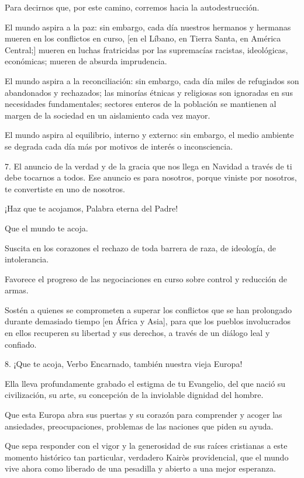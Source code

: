 \begin{body}
	Para decirnos que, por este camino, corremos hacia la autodestrucción.
	
	El mundo aspira a la paz: sin embargo, cada día nuestros hermanos y hermanas mueren en los conflictos en curso, {[}en el Líbano, en Tierra Santa, en América Central;{]} mueren en luchas fratricidas por las supremacías racistas, ideológicas, económicas; mueren de absurda imprudencia.
	
	El mundo aspira a la reconciliación: sin embargo, cada día miles de refugiados son abandonados y rechazados; las minorías étnicas y religiosas son ignoradas en sus necesidades fundamentales; sectores enteros de la población se mantienen al margen de la sociedad en un aislamiento cada vez mayor.
	
	El mundo aspira al equilibrio, interno y externo: sin embargo, el medio ambiente se degrada cada día más por motivos de interés o inconsciencia.
	
	7. El anuncio de la verdad y de la gracia que nos llega en Navidad a través de ti debe tocarnos a todos. Ese anuncio es para nosotros, porque viniste por nosotros, te convertiste en uno de nosotros.
	
	¡Haz que te acojamos, Palabra eterna del Padre!
	
	Que el mundo te acoja.
	
	Suscita en los corazones el rechazo de toda barrera de raza, de ideología, de intolerancia.
	
	Favorece el progreso de las negociaciones en curso sobre control y reducción de armas.
	
	Sostén a quienes se comprometen a superar los conflictos que se han prolongado durante demasiado tiempo {[}en África y Asia{]}, para que los pueblos involucrados en ellos recuperen su libertad y sus derechos, a través de un diálogo leal y confiado.
	
	8. ¡Que te acoja, Verbo Encarnado, también nuestra vieja Europa!
	
	Ella lleva profundamente grabado el estigma de tu Evangelio, del que nació su civilización, su arte, su concepción de la inviolable dignidad del hombre.
	
	Que esta Europa abra sus puertas y su corazón para comprender y acoger las ansiedades, preocupaciones, problemas de las naciones que piden su ayuda.
	
	Que sepa responder con el vigor y la generosidad de sus raíces cristianas a este momento histórico tan particular, verdadero Kairòs providencial, que el mundo vive ahora como liberado de una pesadilla y abierto a una mejor esperanza.
	

\end{body}

